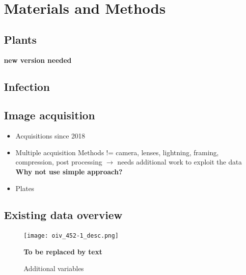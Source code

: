 \documentclass[english]{article}
\begin{document}
\section{Materials and Methods}

\subsection{Plants}

\parencite{bellinResistancePlasmoparaViticola2009} \textbf{new version needed}

\subsection{Infection}

\parencite{bellinResistancePlasmoparaViticola2009}

\subsection{Image acquisition}

\begin{itemize}
	\item Acquisitions since 2018
	\item Multiple acquisition Methods != camera, lenses, lightning, framing, compression, post processing $\rightarrow$ needs additional work to exploit the data \textbf{Why not use simple approach?}
	\item Plates
\end{itemize}

\subsection{Existing data overview}

\begin{figure}
	\begin{center}
		\texttt{[image: oiv\_452-1\_desc.png]}
		\caption{Additional variables}\label{fig:newvariables} \textbf{To be replaced by text}
	\end{center}
\end{figure}
\end{document}
